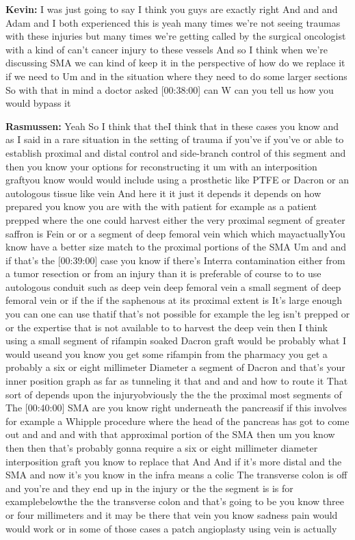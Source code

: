 \documentclass[
]{book}
\begin{document}
\textbf{Kevin:} I was just going to say I think you guys are exactly right
And and and Adam and I both experienced this is yeah many times we're
not seeing traumas with these injuries but many times we're getting
called by the surgical oncologist with a kind of can't cancer injury to
these vessels And so I think when we're discussing SMA we can kind of
keep it in the perspective of how do we replace it if we need to Um and
in the situation where they need to do some larger sections So with that
in mind a doctor asked {[}00:38:00{]} can W can you tell us how you would
bypass it

\textbf{Rasmussen:} Yeah So I think that theI think that in these cases you
know and as I said in a rare situation in the setting of trauma if
you've if you've or able to establish proximal and distal control and
side-branch control of this segment and then you know your options for
reconstructing it um with an interposition graftyou know would would
include using a prosthetic like PTFE or Dacron or an autologous tissue
like vein And here it it just it depends it depends on how prepared you
know you are with the with patient for example as a patient prepped
where the one could harvest either the very proximal segment of greater
saffron is Fein or or a segment of deep femoral vein which which
mayactuallyYou know have a better size match to the proximal portions of
the SMA Um and and if that's the {[}00:39:00{]} case you know if there's
Interra contamination either from a tumor resection or from an injury
than it is preferable of course to to use autologous conduit such as
deep vein deep femoral vein a small segment of deep femoral vein or if
the if the saphenous at its proximal extent is It's large enough you can
one can use thatif that's not possible for example the leg isn't prepped
or or the expertise that is not available to to harvest the deep vein
then I think using a small segment of rifampin soaked Dacron graft would
be probably what I would useand you know you get some rifampin from the
pharmacy you get a probably a six or eight millimeter Diameter a segment
of Dacron and that's your inner position graph as far as tunneling it
that and and and how to route it That sort of depends upon the
injuryobviously the the the proximal most segments of The {[}00:40:00{]} SMA
are you know right underneath the pancreasif if this involves for
example a Whipple procedure where the head of the pancreas has got to
come out and and and with that approximal portion of the SMA then um you
know then then that's probably gonna require a six or eight millimeter
diameter interposition graft you know to replace that And And if it's
more distal and the SMA and now it's you know in the infra means a colic
The transverse colon is off and you're and they end up in the injury or
the the segment is is for examplebelowthe the the transverse colon and
that's going to be you know three or four millimeters and it may be
there that vein you know sadness pain would would work or in some of
those cases a patch angioplasty using vein is actually
\end{document}
